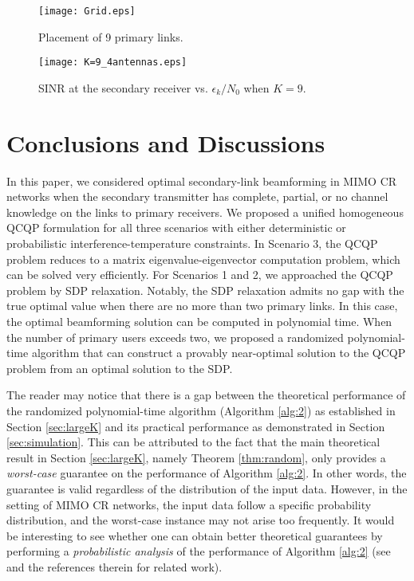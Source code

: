 \documentclass[twocolumn,10pt]{IEEEtran}
\theoremstyle{plain} \newtheorem{theorem}{Theorem}
\theoremstyle{plain} \newtheorem{proposition}{Proposition}
\theoremstyle{plain} \newtheorem{corollary}{Corollary}
\theoremstyle{remark} \newtheorem{remark}{Remark}
\theoremstyle{remark} \newtheorem{lemma}{Lemma}
\theoremstyle{plain} \newtheorem{definition}{Definition}
\theoremstyle{plain} \newtheorem{assumption}{Assumption}
\theoremstyle{plain} \newtheorem{fact}{Fact}
\begin{document}
\begin{figure}[!ht]
\centering
\texttt{[image: Grid.eps]}
\caption{Placement of 9 primary links.}\label{fig:grid}
\end{figure}

\begin{figure}[!ht]
\centering
\texttt{[image: K=9\_4antennas.eps]}
\caption{SINR at the secondary receiver vs. $\epsilon_k/N_0$ when $K=9$.}\label{fig:K9SINR}
\end{figure}

\section{Conclusions and Discussions}\label{section:conclusions}
In this paper, we considered optimal secondary-link beamforming in MIMO CR networks when the secondary transmitter has complete, partial, or no channel knowledge on the links to primary receivers. We proposed a unified homogeneous QCQP formulation for all three scenarios with either deterministic or probabilistic interference-temperature constraints. In Scenario 3, the QCQP problem reduces to a matrix eigenvalue-eigenvector computation problem, which can be solved very efficiently. For Scenarios 1 and 2, we approached the QCQP problem by SDP relaxation. Notably, the SDP relaxation admits no gap with the true optimal value when there are no more than two primary links. In this case, the optimal beamforming solution can be computed in polynomial time. When the number of primary users exceeds two, we proposed a randomized polynomial-time algorithm that can construct a provably near-optimal solution to the QCQP problem from an optimal solution to the SDP.

The reader may notice that there is a gap between the theoretical performance of the randomized polynomial-time algorithm (Algorithm \ref{alg:2}) as established in Section \ref{sec:largeK} and its practical performance as demonstrated in Section \ref{sec:simulation}.  This can be attributed to the fact that the main theoretical result in Section \ref{sec:largeK}, namely Theorem \ref{thm:random}, only provides a {\it worst-case} guarantee on the performance of Algorithm \ref{alg:2}.  In other words, the guarantee is valid regardless of the distribution of the input data.  However, in the setting of MIMO CR networks, the input data follow a specific probability distribution, and the worst-case instance may not arise too frequently.  It would be interesting to see whether one can obtain better theoretical guarantees by performing a {\it probabilistic analysis} of the performance of Algorithm \ref{alg:2} (see \cite{SY10} and the references therein for related work).
\end{document}
